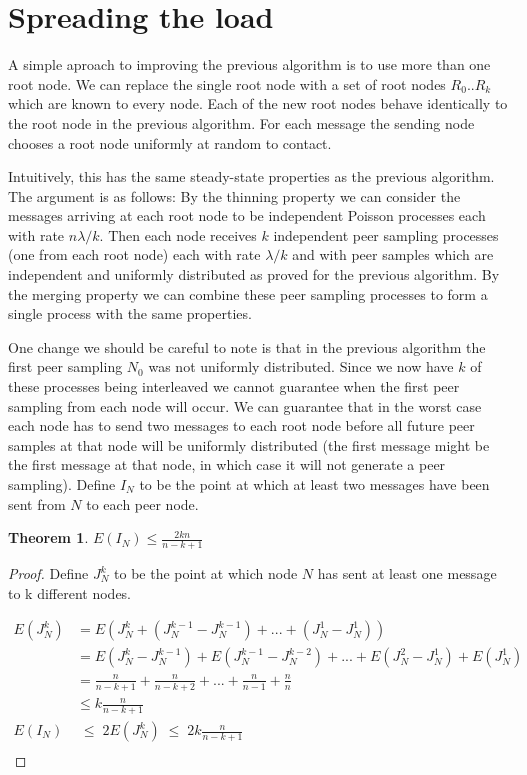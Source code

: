 \documentclass[a4paper,10pt]{article}
\newtheorem*{thm}{Theorem}
\begin{document}
\section{Spreading the load}

A simple aproach to improving the previous algorithm is to use more than one root node. We can replace the single root node with a set of root nodes $R_0 .. R_k$ which are known to every node. Each of the new root nodes behave identically to the root node in the previous algorithm. For each message the sending node chooses a root node uniformly at random to contact. 

Intuitively, this has the same steady-state properties as the previous algorithm. The argument is as follows: By the thinning property we can consider the messages arriving at each root node to be independent Poisson processes each with rate $n \lambda / k$. Then each node receives $k$ independent peer sampling processes (one from each root node) each with rate $\lambda / k$ and with peer samples which are independent and uniformly distributed as proved for the previous algorithm. By the merging property we can combine these peer sampling processes to form a single process with the same properties. 

One change we should be careful to note is that in the previous algorithm the first peer sampling $N_0$ was not uniformly distributed. Since we now have $k$ of these processes being interleaved we cannot guarantee when the first peer sampling from each node will occur. We can guarantee that in the worst case each node has to send two messages to each root node before all future peer samples at that node will be uniformly distributed (the first message might be the first message at that node, in which case it will not generate a peer sampling).
Define $I_N$ to be the point at which at least two messages have been sent from $N$ to each peer node.

\begin{thm}$E(I_N) \leq \frac{2kn}{n-k+1}$\end{thm}  

\begin{proof}
Define $J^k_N$ to be the point at which node $N$ has sent at least one message to k different nodes.

\begin{align*}
E(J^k_N) &= E(J^k_N + (J^{k-1}_N - J^{k-1}_N) + ... + (J^1_N - J^1_N)) \\
  &= E(J^k_N - J^{k-1}_N) + E(J^{k-1}_N - J^{k-2}_N) + ... + E(J^2_N - J^1_N) + E(J^1_N) \\
  &= \frac{n}{n-k+1} + \frac{n}{n-k+2} + ... + \frac{n}{n-1} + \frac{n}{n} \\
  &\leq k\frac{n}{n-k+1} \\
E(I_N) & \;\leq\; 2 E(J^k_N) \;\leq\; 2k\frac{n}{n-k+1} \\
\end{align*}
\end{proof}
\end{document}
